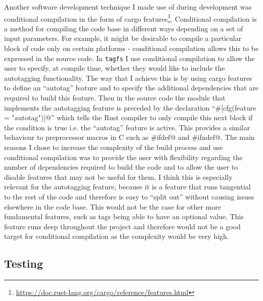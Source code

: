 Another software development technique I made use of during development was
conditional compilation in the form of cargo
features\footnote{\url{https://doc.rust-lang.org/cargo/reference/features.html}}.
Conditional compilation is a method for compiling the code base in different
ways depending on a set of input parameters. For example, it might be desirable
to compile a particular block of code only on certain platforms - conditional
compilation allows this to be expressed in the source code.  In \texttt{tagfs} I use conditional
compilation to allow the user to specify, at compile time, whether they would
like to include the autotagging functionality. The way that I achieve this is
by using cargo features to define an ``autotag'' feature and to specify the
additional dependencies that are required to build this feature. Then in the
source code the module that implements the autotagging feature is preceded by
the declaration ``\verb@#[cfg(feature = "autotag")]@'' which tells the Rust
compiler to only compile this next block if the condition is true i.e. the
``autotag'' feature is active. This provides a similar behaviour to
preprocessor macros in C such as \verb@#ifdef@ and \verb@#ifndef@. The main
reasons I chose to increase the complexity of the build process and use
conditional compilation was to provide the user with flexibility regarding the
number of dependencies required to build the code and to allow the user to
disable features that may not be useful for them. I think this is especially
relevant for the autotagging feature, because it is a feature that runs
tangential to the rest of the code and therefore is easy to ``split out''
without causing issues elsewhere in the code base.
This would not be the case for other more fundamental features, such as tags
being able to have an optional value. This feature runs deep throughout the
project and therefore would not be a good target for conditional compilation as
the complexity would be very high.

\subsection{Testing}
\label{sec:testing}


